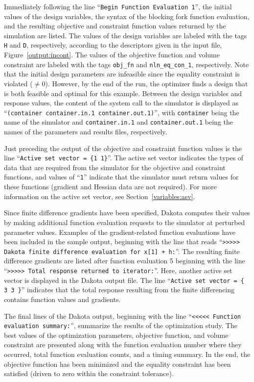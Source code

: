 Immediately following the line ``\texttt{Begin Function Evaluation
  1}'', the initial values of the design variables, the syntax of the
blocking fork function evaluation, and the resulting objective and
constraint function values returned by the simulation are listed.  The
values of the design variables are labeled with the tags \texttt{H}
and \texttt{D}, respectively, according to the descriptors given in
the input file, Figure~\ref{output:incont}.  The values of the
objective function and volume constraint are labeled with the tags
\texttt{obj\_fn} and \texttt{nln\_eq\_con\_1}, respectively. Note that
the initial design parameters are infeasible since the equality
constraint is violated ($\ne 0$). However, by the end of the run, the
optimizer finds a design that is both feasible and optimal for this
example. Between the design variables and response values, the content
of the system call to the simulator is displayed as
``\texttt{(container container.in.1 container.out.1)}'', with
\texttt{container} being the name of the simulator and
\texttt{container.in.1} and \texttt{container.out.1} being the names
of the parameters and results files, respectively.

Just preceding the output of the objective and constraint function
values is the line ``\texttt{Active set vector = \{1 1\}}''. The
active set vector indicates the types of data that are required from
the simulator for the objective and constraint functions, and values
of ``\texttt{1}'' indicate that the simulator must return values for
these functions (gradient and Hessian data are not required). For more
information on the active set vector, see Section~\ref{variables:asv}.

Since finite difference gradients have been specified, Dakota computes
their values by making additional function evaluation requests to the
simulator at perturbed parameter values. Examples of the
gradient-related function evaluations have been included in the sample
output, beginning with the line that reads ``\texttt{>>>>> Dakota
  finite difference evaluation for x[1] + h:}''. The resulting finite
difference gradients are listed after function evaluation 5 beginning
with the line ``\texttt{>>>>> Total response returned to iterator:}''.
Here, another active set vector is displayed in the Dakota output
file. The line ``\texttt{Active set vector = \{ 3 3 \}}'' indicates
that the total response resulting from the finite differencing
contains function values and gradients.

The final lines of the Dakota output, beginning with the line
``\texttt{<<<<< Function evaluation summary:}'', summarize the
results of the optimization study. The best values of the optimization
parameters, objective function, and volume constraint are presented
along with the function evaluation number where they occurred, total
function evaluation counts, and a timing summary. In the end, the
objective function has been minimized and the equality constraint has
been satisfied (driven to zero within the constraint tolerance).


